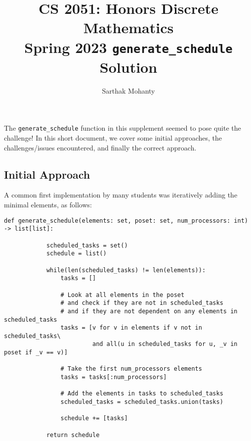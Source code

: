 \documentclass{article}
\title{\vspace{-1cm}CS 2051: Honors Discrete Mathematics \\Spring 2023 \texttt{generate\_schedule} Solution}
\author{Sarthak Mohanty }
\date{}
\begin{document}
\maketitle

The \lstinline{generate_schedule} function in this supplement seemed to pose quite the challenge! In this short document, we cover some initial approaches, the challenges/issues encountered, and finally the correct approach.

\subsection*{Initial Approach}

\vspace{3mm}
A common first implementation by many students was iteratively adding the minimal elements, as follows:

\begin{tcolorbox}[enhanced,title=Incorrect Approach,
    colframe=red!50!black,colback=red!10!white,
    arc=1mm,colbacktitle=red!10!white,
    fonttitle=\bfseries,coltitle=red!50!black,
    attach boxed title to top center=
    {yshift=-2mm,yshifttext=-1mm},
    boxed title style={
    interior style={fill=none,
    top color=red!30!white,
    bottom color=red!20!white}}]
    \begin{lstlisting}[belowskip=-10pt]
        def generate_schedule(elements: set, poset: set, num_processors: int) -> list[list]:
        
            scheduled_tasks = set()
            schedule = list()
         
            while(len(scheduled_tasks) != len(elements)):
                tasks = []
                
                # Look at all elements in the poset
                # and check if they are not in scheduled_tasks
                # and if they are not dependent on any elements in scheduled_tasks
                tasks = [v for v in elements if v not in scheduled_tasks\
                         and all(u in scheduled_tasks for u, _v in poset if _v == v)]
        
                # Take the first num_processors elements
                tasks = tasks[:num_processors]
        
                # Add the elements in tasks to scheduled_tasks
                scheduled_tasks = scheduled_tasks.union(tasks)
        
                schedule += [tasks]
            
            return schedule
    \end{lstlisting}
\end{tcolorbox}
\end{document}
